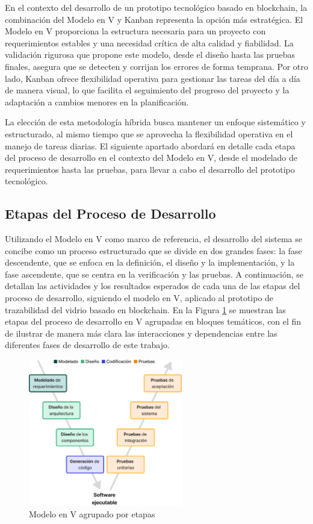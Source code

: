 En el contexto del desarrollo de un prototipo tecnológico basado en blockchain, la combinación del Modelo en V y Kanban representa la opción más estratégica. El Modelo en V proporciona la estructura necesaria para un proyecto con requerimientos estables y una necesidad crítica de alta calidad y fiabilidad. La validación rigurosa que propone este modelo, desde el diseño hasta las pruebas finales, asegura que se detecten y corrijan los errores de forma temprana. Por otro lado, Kanban ofrece flexibilidad operativa para gestionar las tareas del día a día de manera visual, lo que facilita el seguimiento del progreso del proyecto y la adaptación a cambios menores en la planificación.

La elección de esta metodología híbrida busca mantener un enfoque sistemático y estructurado, al mismo tiempo que se aprovecha la flexibilidad operativa en el manejo de tareas diarias. El siguiente apartado abordará en detalle cada etapa del proceso de desarrollo en el contexto del Modelo en V, desde el modelado de requerimientos hasta las pruebas, para llevar a cabo el desarrollo del prototipo tecnológico.

\subsection{Etapas del Proceso de Desarrollo}

Utilizando el Modelo en V como marco de referencia, el desarrollo del sistema se concibe como un proceso estructurado que se divide en dos grandes fases: la fase descendente, que se enfoca en la definición, el diseño y la implementación, y la fase ascendente, que se centra en la verificación y las pruebas. A continuación, se detallan las actividades y los resultados esperados de cada una de las etapas del proceso de desarrollo, siguiendo el modelo en V, aplicado al prototipo de trazabilidad del vidrio basado en blockchain. En la Figura \ref{fig:methodology-v-grouped} se muestran las etapas del proceso de desarrollo en V agrupadas en bloques temáticos, con el fin de ilustrar de manera más clara las interacciones y dependencias entre las diferentes fases de desarrollo de este trabajo.

\begin{figure}[!tb]
	\centering
	\includegraphics[width=0.6\textwidth]{Figures/model-v-grouped.png}
	\caption{Modelo en V agrupado por etapas}
    \label{fig:methodology-v-grouped}
\end{figure}


